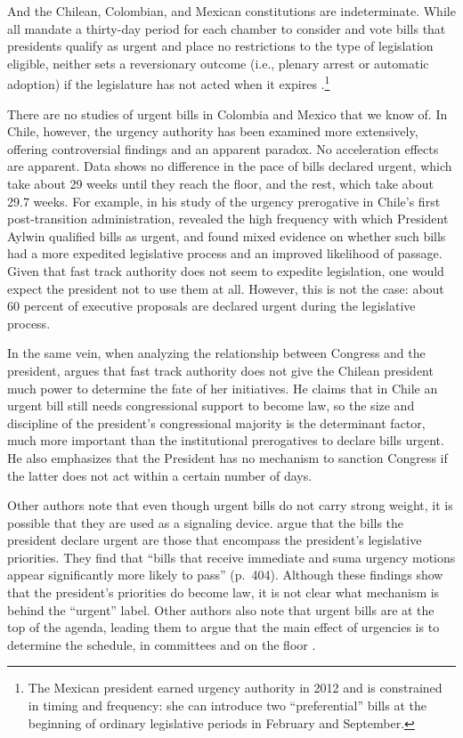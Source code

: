 And the Chilean, Colombian, and Mexican constitutions are indeterminate. While all mandate a thirty-day period for each chamber to consider and vote bills that presidents qualify as urgent and place no restrictions to the type of legislation eligible, neither sets a reversionary outcome (i.e., plenary arrest or automatic adoption) if the legislature has not acted when it expires \citep{nolte.2003,carroll-pachon.2016,magar.2014-refConst}.\footnote{The Mexican president earned urgency authority in 2012 and is constrained in timing and frequency: she can introduce two ``preferential'' bills at the beginning of ordinary legislative periods in February and September.}

There are no studies of urgent bills in Colombia and Mexico that we know of. In Chile, however, the urgency authority has been examined more extensively, offering controversial findings and an apparent paradox. No acceleration effects are apparent. Data shows no difference in the pace of bills declared urgent, which take about 29 weeks until they reach the floor, and the rest, which take about 29.7 weeks. For example, in his study of the urgency prerogative in Chile's first post-transition administration, \citet{siavelis.2002} revealed the high frequency with which President Aylwin qualified bills as urgent, and found mixed evidence on whether such bills had a more expedited legislative process and an improved likelihood of passage. Given that fast track authority does not seem to expedite legislation, one would expect the president not to use them at all. However, this is not the case: about 60 percent of executive proposals are declared urgent during the legislative process. 

In the same vein, when analyzing the relationship between Congress and the president, \citet[][:51]{nolte.2003} argues that fast track authority does not give the Chilean president much power to determine the fate of her initiatives. He claims that in Chile an urgent bill still needs congressional support to become law, so the size and discipline of the president's congressional majority is the determinant factor, much more important than the institutional prerogatives to declare bills urgent. He also emphasizes that the President has no mechanism to sanction Congress if the latter does not act within a certain number of days.

Other authors note that even though urgent bills do not carry strong weight, it is possible that they are used as a signaling device. \citet{aleman.navia.UrgChi.2009} argue that the bills the president declare urgent are those that encompass the president's legislative priorities. They find that ``bills that receive immediate and suma urgency motions appear significantly more likely to pass'' (p.~404). Although these findings show that the president's priorities do become law, it is not clear what mechanism is behind the ``urgent'' label. Other authors also note that urgent bills are at the top of the agenda, leading them to argue that the main effect of urgencies is to determine the schedule, in committees and on the floor \citep{aninat.exagCoop2006}. 

